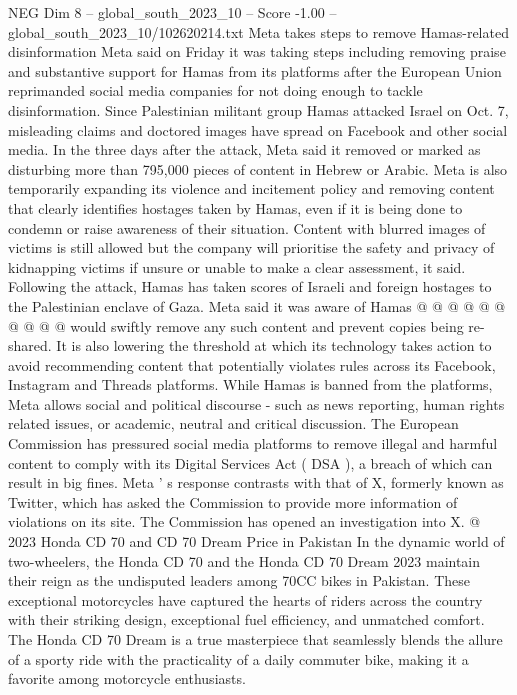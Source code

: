 \begin{textsample}{NEG Dim 8 – global\_south\_2023\_10 – Score -1.00 – global\_south\_2023\_10/102620214.txt}  \label{ex:f8_neg_094}
Meta takes steps to remove Hamas-related disinformation Meta said on Friday it was taking steps including removing praise and substantive support for Hamas from its platforms after the European Union reprimanded social media companies for not doing enough to tackle disinformation.
Since Palestinian militant group Hamas attacked Israel on Oct. 7, misleading claims and doctored images have spread on Facebook and other social media.
In the three days after the attack, Meta said it removed or marked as disturbing more than 795,000 pieces of content in Hebrew or Arabic.
Meta is also temporarily expanding its violence and incitement policy and removing content that clearly identifies hostages taken by Hamas, even if it is being done to condemn or raise awareness of their situation.
Content with blurred images of victims is still allowed but the company will prioritise the safety and privacy of kidnapping victims if unsure or unable to make a clear assessment, it said.
Following the attack, Hamas has taken scores of Israeli and foreign hostages to the Palestinian enclave of Gaza.
Meta said it was aware of Hamas @ @ @ @ @ @ @ @ @ @ would swiftly remove any such content and prevent copies being re-shared.
It is also lowering the threshold at which its technology takes action to avoid recommending content that potentially violates rules across its Facebook, Instagram and Threads platforms.
While Hamas is banned from the platforms, Meta allows social and political discourse - such as news reporting, human rights related issues, or academic, neutral and critical discussion.
The European Commission has pressured social media platforms to remove illegal and harmful content to comply with its Digital Services Act ( DSA ), a breach of which can result in big fines.
Meta ' s response contrasts with that of X, formerly known as Twitter, which has asked the Commission to provide more information of violations on its site.
The Commission has opened an investigation into X. @ 2023 Honda CD 70 and CD 70 Dream Price in Pakistan In the dynamic world of two-wheelers, the Honda CD 70 and the Honda CD 70 Dream 2023 maintain their reign as the undisputed leaders among 70CC bikes in Pakistan.
These exceptional motorcycles have captured the hearts of riders across the country with their striking design, exceptional fuel efficiency, and unmatched comfort.
The Honda CD 70 Dream is a true masterpiece that seamlessly blends the allure of a sporty ride with the practicality of a daily commuter bike, making it a favorite among motorcycle enthusiasts.

\end{textsample}
